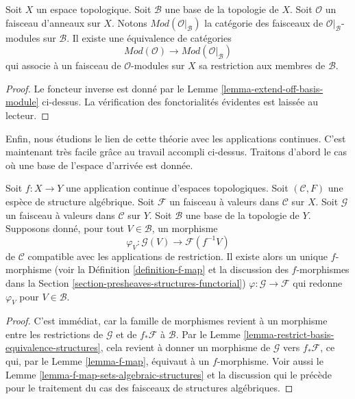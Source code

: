 \begin{lemma}
\label{lemma-restrict-basis-equivalence-modules}
Soit $X$ un espace topologique.
Soit $\mathcal{B}$ une base de la topologie de $X$.
Soit $\mathcal{O}$ un faisceau d'anneaux sur $X$.
Notons $\textit{Mod}(\mathcal{O}|_\mathcal{B})$ la catégorie des
faisceaux de $\mathcal{O}|_\mathcal{B}$-modules sur $\mathcal{B}$.
Il existe une équivalence de catégories
$$
\textit{Mod}(\mathcal{O})
\longrightarrow
\textit{Mod}(\mathcal{O}|_\mathcal{B})
$$
qui associe à un faisceau de $\mathcal{O}$-modules sur $X$ sa restriction aux
membres de $\mathcal{B}$.
\end{lemma}

\begin{proof}
Le foncteur inverse est donné par le
Lemme \ref{lemma-extend-off-basis-module} ci-dessus.
La vérification des fonctorialités évidentes est laissée au lecteur.
\end{proof}

\noindent
Enfin, nous étudions le lien de cette théorie avec les
applications continues. C'est maintenant très facile grâce au travail
accompli ci-dessus. Traitons d'abord le cas où une base de l'espace
d'arrivée est donnée.

\begin{lemma}
\label{lemma-f-map-basis-below-structures}
Soit $f : X \to Y$ une application continue d'espaces topologiques.
Soit $(\mathcal{C}, F)$ une espèce de structure algébrique.
Soit $\mathcal{F}$ un faisceau à valeurs dans $\mathcal{C}$ sur $X$.
Soit $\mathcal{G}$ un faisceau à valeurs dans $\mathcal{C}$ sur $Y$.
Soit $\mathcal{B}$ une base de la topologie de $Y$.
Supposons donné, pour tout $V \in \mathcal{B}$, un morphisme
$$
\varphi_V :
\mathcal{G}(V)
\longrightarrow
\mathcal{F}(f^{-1}V)
$$
de $\mathcal{C}$ compatible avec les applications de restriction.
Il existe alors un unique $f$-morphisme (voir la Définition \ref{definition-f-map}
et la discussion des $f$-morphismes dans la
Section \ref{section-presheaves-structures-functorial})
$\varphi : \mathcal{G} \to \mathcal{F}$
qui redonne $\varphi_V$ pour $V \in \mathcal{B}$.
\end{lemma}

\begin{proof}
C'est immédiat, car la famille de morphismes
revient à un morphisme entre les restrictions
de $\mathcal{G}$ et de $f_*\mathcal{F}$ à $\mathcal{B}$.
Par le Lemme \ref{lemma-restrict-basis-equivalence-structures},
cela revient à donner un morphisme de $\mathcal{G}$
vers $f_*\mathcal{F}$, ce qui, par le Lemme \ref{lemma-f-map},
équivaut à un $f$-morphisme. Voir aussi le
Lemme \ref{lemma-f-map-sets-algebraic-structures}
et la discussion qui le précède
pour le traitement du cas des faisceaux de structures algébriques.
\end{proof}

